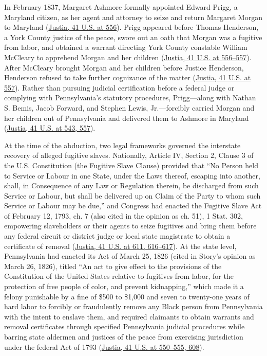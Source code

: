 \documentclass[12pt]{article}
\begin{document}
In February 1837, Margaret Ashmore formally appointed Edward Prigg, a Maryland citizen, as her agent and attorney to seize and return Margaret Morgan to Maryland (\href{https://supreme.justia.com/cases/federal/us/41/539/}{Justia, 41 U.S. at 556}). Prigg appeared before Thomas Henderson, a York County justice of the peace, swore out an oath that Morgan was a fugitive from labor, and obtained a warrant directing York County constable William McCleary to apprehend Morgan and her children (\href{https://supreme.justia.com/cases/federal/us/41/539/}{Justia, 41 U.S. at 556--557}). After McCleary brought Morgan and her children before Justice Henderson, Henderson refused to take further cognizance of the matter (\href{https://supreme.justia.com/cases/federal/us/41/539/}{Justia, 41 U.S. at 557}). Rather than pursuing judicial certification before a federal judge or complying with Pennsylvania's statutory procedures, Prigg---along with Nathan S. Bemis, Jacob Forward, and Stephen Lewis, Jr.---forcibly carried Morgan and her children out of Pennsylvania and delivered them to Ashmore in Maryland (\href{https://supreme.justia.com/cases/federal/us/41/539/}{Justia, 41 U.S. at 543, 557}).

At the time of the abduction, two legal frameworks governed the interstate recovery of alleged fugitive slaves. Nationally, Article IV, Section 2, Clause 3 of the U.S. Constitution (the Fugitive Slave Clause) provided that ``No Person held to Service or Labour in one State, under the Laws thereof, escaping into another, shall, in Consequence of any Law or Regulation therein, be discharged from such Service or Labour, but shall be delivered up on Claim of the Party to whom such Service or Labour may be due,'' and Congress had enacted the Fugitive Slave Act of February 12, 1793, ch. 7 (also cited in the opinion as ch. 51), 1 Stat. 302, empowering slaveholders or their agents to seize fugitives and bring them before any federal circuit or district judge or local state magistrate to obtain a certificate of removal (\href{https://supreme.justia.com/cases/federal/us/41/539/}{Justia, 41 U.S. at 611, 616--617}). At the state level, Pennsylvania had enacted its Act of March 25, 1826 (cited in Story's opinion as March 26, 1826), titled ``An act to give effect to the provisions of the Constitution of the United States relative to fugitives from labor, for the protection of free people of color, and prevent kidnapping,'' which made it a felony punishable by a fine of \$500 to \$1,000 and seven to twenty-one years of hard labor to forcibly or fraudulently remove any Black person from Pennsylvania with the intent to enslave them, and required claimants to obtain warrants and removal certificates through specified Pennsylvania judicial procedures while barring state aldermen and justices of the peace from exercising jurisdiction under the federal Act of 1793 (\href{https://supreme.justia.com/cases/federal/us/41/539/}{Justia, 41 U.S. at 550--555, 608}).
\end{document}
